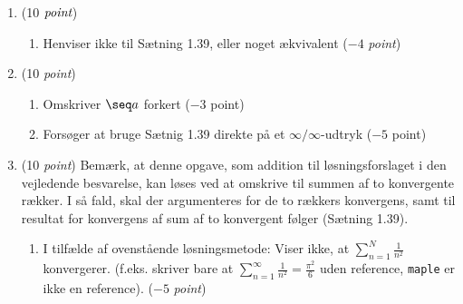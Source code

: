 \documentclass{article}
\begin{document}
\begin{opg}\hfill
	\begin{enumerate}
		\item (10 $ \emph{point} $)
		\begin{enumerate}[label=(\roman*)]
			\item Henviser ikke til Sætning 1.39, eller noget ækvivalent ($ -4 $ \emph{point}) 
		\end{enumerate}
		\item (10 \emph{point}) 
		\begin{enumerate}[label=(\roman*)]
			\item Omskriver $ \seq a $ forkert ($ -3 $ point)
			\item Forsøger at bruge Sætnig 1.39 direkte på et $ \infty/\infty $-udtryk ($ -5 $ point)
		\end{enumerate}
		\item (10 \emph{point}) Bemærk, at denne opgave, som addition til løsningsforslaget i den vejledende besvarelse, kan løses ved at omskrive til summen af to konvergente rækker. I så fald, skal der argumenteres for de to rækkers konvergens, samt til resultat for konvergens af sum af to konvergent følger (Sætning 1.39).
		\begin{enumerate}[label=(\roman*)]
			\item I tilfælde af ovenstående løsningsmetode: Viser ikke, at $ \sum_{n=1}^{N}\frac{1}{n^2} $ konvergerer. (f.eks. skriver bare at $ \sum_{n=1}^{\infty}\frac{1}{n^2}=\frac{\pi^2}{6} $ uden reference, \texttt{maple} er ikke en reference). ($ -5 $ \emph{point})
		\end{enumerate}
	\end{enumerate}
\end{opg}
\end{document}
